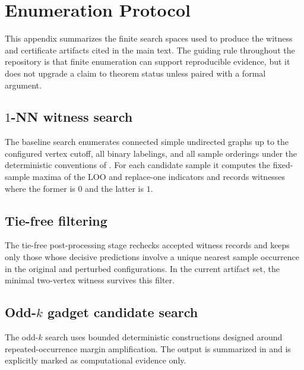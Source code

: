 \section{Enumeration Protocol}
\label{sec:enumeration-protocol}

This appendix summarizes the finite search spaces used to produce the witness
and certificate artifacts cited in the main text. The guiding rule throughout
the repository is that finite enumeration can support reproducible evidence, but
it does not upgrade a claim to theorem status unless paired with a formal
argument.

\subsection[1-NN witness search]{$1$-NN witness search}

The baseline search enumerates connected simple undirected graphs up to the
configured vertex cutoff, all binary labelings, and all sample orderings under
the deterministic conventions of . For each candidate
sample it computes the fixed-sample maxima of the LOO and replace-one
indicators and records witnesses where the former is $0$ and the latter is $1$.

\subsection{Tie-free filtering}

The tie-free post-processing stage rechecks accepted witness records and keeps
only those whose decisive predictions involve a unique nearest sample occurrence
in the original and perturbed configurations. In the current artifact set, the
minimal two-vertex witness survives this filter.

\subsection[Odd-k gadget candidate search]{Odd-$k$ gadget candidate search}

The odd-$k$ search uses bounded deterministic constructions designed around
repeated-occurrence margin amplification. The output is summarized in
 and is explicitly marked as computational
evidence only.


